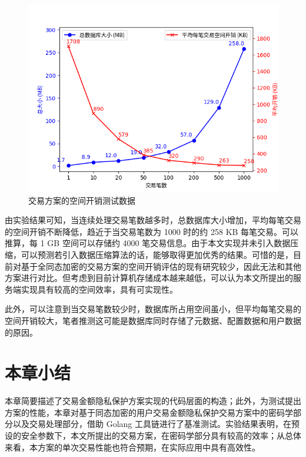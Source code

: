 \begin{figure}[h]
    \centering
    \includegraphics[width=0.8\linewidth]{./Figures/matplots/Bench_DatabaseSize.png}
    \caption{交易方案的空间开销测试数据} \label{Fig:graph_database_size}
\end{figure}

由实验结果可知，当连续处理交易笔数越多时，总数据库大小增加，平均每笔交易的空间开销不断降低，趋近于当交易笔数为 1000 时的约 258 KB 每笔交易。可以推算，每 1 GB 空间可以存储约 4000 笔交易信息。由于本文实现并未引入数据压缩，可以预测若引入数据压缩算法的话，能够取得更加优秀的结果。可惜的是，目前对基于全同态加密的交易方案的空间开销评估的现有研究较少，因此无法和其他方案进行对比。但考虑到目前计算机存储成本越来越低，可以认为本文所提出的服务端实现具有较高的空间效率，具有可实现性。

此外，可以注意到当交易笔数较少时，数据库所占用空间虽小，但平均每笔交易的空间开销较大，笔者推测这可能是数据库同时存储了元数据、配置数据和用户数据的原因。

\section{本章小结}

本章简要描述了交易金额隐私保护方案实现的代码层面的构造；此外，为测试提出方案的性能，本章对基于同态加密的用户交易金额隐私保护交易方案中的密码学部分以及交易处理部分，借助 Golang 工具链进行了基准测试。实验结果表明，在预设的安全参数下，本文所提出的交易方案，在密码学部分具有较高的效率；从总体来看，本方案的单次交易性能也符合预期，在实际应用中具有高效性。
